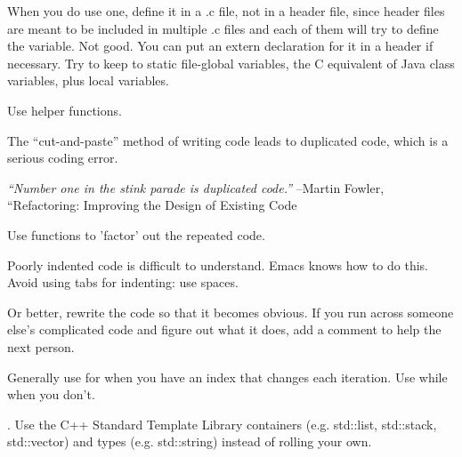 \documentclass{article}
\begin{document}
%
When you do use one, define it in a .c file, not in a header file,
since header files are meant to be included in multiple .c files and
each of them will try to define the variable.  Not good.  You can put
an extern declaration for it in a header if necessary.  Try to keep to
static file-global variables, the C equivalent of Java class
variables, plus local variables.

%
Use helper functions.

%

The ``cut-and-paste'' method of writing code leads to duplicated code,
which is a serious coding error.  

\textit{``Number one in the stink parade is duplicated code.''}  --Martin Fowler, ``Refactoring: Improving the Design of Existing Code




Use functions to 'factor' out the repeated code.

%
Poorly indented code is difficult to understand.  Emacs knows how to
do this.  Avoid using tabs for indenting: use spaces.


%
  Or better, rewrite the code so that it becomes obvious.  If you run
  across someone else's complicated code and figure out what it does,
  add a comment to help the next person.

%
  Generally use for when you have an index that changes each
  iteration.  Use while when you don't.



.  Use the C++ Standard Template Library
containers (e.g. std::list, std::stack, std::vector) and types
(e.g. std::string) instead of rolling your own.
\end{document}
